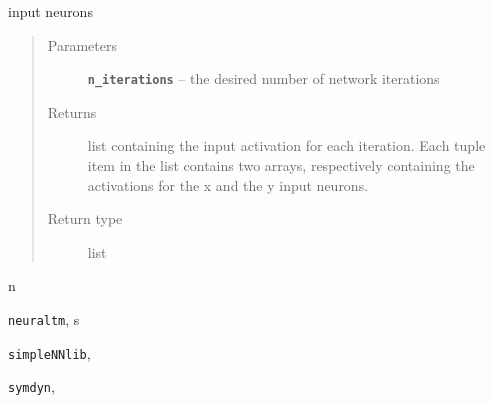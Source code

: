 \documentclass[letterpaper,10pt,english]{sphinxmanual}
\begin{document}
\begin{fulllineitems}
\begin{fulllineitems}
\begin{quote}
\begin{description}
\end{description}\end{quote}

input neurons
\begin{quote}\begin{description}
\item[{Parameters}] \leavevmode
\textbf{\texttt{n\_iterations}} -- the desired number of network iterations

\item[{Returns}] \leavevmode
list containing the input activation for each
iteration. Each tuple item in the list contains two
arrays, respectively containing the activations for the x
and the y input neurons.  

\item[{Return type}] \leavevmode
list

\end{description}\end{quote}

\end{fulllineitems}


\end{fulllineitems}


\begin{thebibliography}{Moore91}
\end{thebibliography}


\renewcommand{\indexname}{Python Module Index}
\begin{theindex}
\def\bigletter#1{{\Large\sffamily#1}\nopagebreak\vspace{1mm}}
\bigletter{n}
\item {\texttt{neuraltm}}, \pageref{neuraltm_docs:module-neuraltm}
\indexspace
\bigletter{s}
\item {\texttt{simpleNNlib}}, \pageref{simpleNNlib_docs:module-simpleNNlib}
\item {\texttt{symdyn}}, \pageref{symdyn_docs:module-symdyn}
\end{theindex}

\renewcommand{\indexname}{Index}
\printindex
\end{document}
